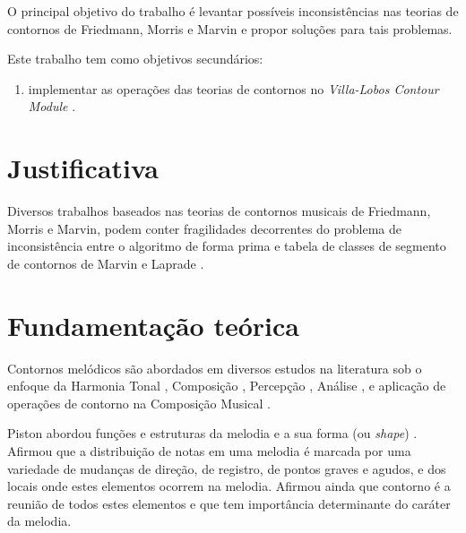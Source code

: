 \documentclass[12pt]{article}
\newcommand{\eng}[1]{\textit{#1}}
\begin{document}
O principal objetivo do trabalho é levantar possíveis inconsistências
nas teorias de contornos de Friedmann, Morris e Marvin e propor
soluções para tais problemas.

Este trabalho tem como objetivos secundários:

\begin{enumerate}
\item implementar as operações das teorias de contornos no
  \eng{Villa-Lobos Contour Module} \cite{sampaio.ea10:villa-lobos}.
\end{enumerate}

\section{Justificativa}
\label{sec:justificativa}

Diversos trabalhos baseados nas teorias de contornos musicais de
Friedmann, Morris e Marvin, podem conter fragilidades decorrentes do
problema de inconsistência entre o algoritmo de forma prima e tabela
de classes de segmento de contornos de Marvin e Laprade
\cite{marvin.ea87:relating}.

\section{Fundamentação teórica}
\label{sec:fund-teor}


Contornos melódicos são abordados em diversos estudos na literatura
sob o enfoque da Harmonia Tonal \cite{piston59:harmony}, Composição
\cite{schoenberg67:fundamentals,toch77:shaping}, Percepção
\cite{edworthy85:musical,dewitt.ea86:recognition}, Análise
\cite{adams76:melodic,friedmann85:methodology,friedmann87:response,marvin.ea87:relating,marvin88:generalized,marvin91:perception,marvin.ea95:generalization,morris87:composition,morris93:directions,morris95:compositional,clifford95:contour,beard03:contour,bor09:contour,schultz08:melodic,schultz09:diachronic},
e aplicação de operações de contorno na Composição Musical
\cite{sampaio08:em}.



Piston abordou funções e estruturas da melodia e a sua forma (ou
\eng{shape}) \cite{piston59:harmony}. Afirmou que a distribuição de
notas em uma melodia é marcada por uma variedade de mudanças de
direção, de registro, de pontos graves e agudos, e dos locais onde
estes elementos ocorrem na melodia. Afirmou ainda que contorno é a
reunião de todos estes elementos e que tem importância determinante do
caráter da melodia.
\end{document}
